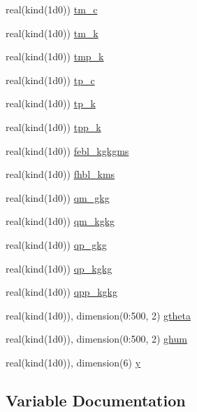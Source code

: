 \begin{DoxyCompactItemize}
real(kind(1d0)) \hyperlink{namespacecbl__module_a9981080497583b5953927b0a2bbdcde8}{tm\+\_\+c}
\item 
real(kind(1d0)) \hyperlink{namespacecbl__module_afb21accdfbc0b24e12b24a44ffd9d6d1}{tm\+\_\+k}
\item 
real(kind(1d0)) \hyperlink{namespacecbl__module_a8cbccf2c4274c8e254bdd331947d39b8}{tmp\+\_\+k}
\item 
real(kind(1d0)) \hyperlink{namespacecbl__module_a7b92d87a613cb13145b7c84beced7f67}{tp\+\_\+c}
\item 
real(kind(1d0)) \hyperlink{namespacecbl__module_af9b1b9c8cf1a15dca9b8750920a048c3}{tp\+\_\+k}
\item 
real(kind(1d0)) \hyperlink{namespacecbl__module_a63c8fb6ebf38a621ec616ddb04445f03}{tpp\+\_\+k}
\item 
real(kind(1d0)) \hyperlink{namespacecbl__module_a5b2329a6a103326f5fa08282787d83aa}{febl\+\_\+kgkgms}
\item 
real(kind(1d0)) \hyperlink{namespacecbl__module_a3bb0811c2c1eb194eff7132bb1a906ef}{fhbl\+\_\+kms}
\item 
real(kind(1d0)) \hyperlink{namespacecbl__module_a652625bc960f05e00df2f7bf48cb7444}{qm\+\_\+gkg}
\item 
real(kind(1d0)) \hyperlink{namespacecbl__module_aa9e98a57d9be62a92919841c4ad428b9}{qm\+\_\+kgkg}
\item 
real(kind(1d0)) \hyperlink{namespacecbl__module_a45208115b84dad98c55d11cf93307c0c}{qp\+\_\+gkg}
\item 
real(kind(1d0)) \hyperlink{namespacecbl__module_a19585b12b6f9726bfbda1954703b7b4d}{qp\+\_\+kgkg}
\item 
real(kind(1d0)) \hyperlink{namespacecbl__module_a9698f773fdba998c463aa4dad50675a6}{qpp\+\_\+kgkg}
\item 
real(kind(1d0)), dimension(0\+:500, 2) \hyperlink{namespacecbl__module_aa6c88eb40ac8bd6e5a7df04080288218}{gtheta}
\item 
real(kind(1d0)), dimension(0\+:500, 2) \hyperlink{namespacecbl__module_a2c8e164b18520600e084ab16825b7996}{ghum}
\item 
real(kind(1d0)), dimension(6) \hyperlink{namespacecbl__module_a3d7f7d5671cd679f69c81da2fbf797e2}{y}
\end{DoxyCompactItemize}


\subsection{Variable Documentation}
\mbox{\label{namespacecbl__module_ab09c1f0f6b67d7bdf17278e617fc35ba}} 
